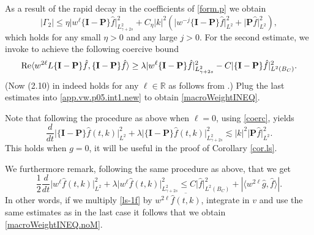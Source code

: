 \documentclass{amsart}
\numberwithin{equation}{section}
\begin{document}
As a result of the rapid decay in the coefficients of \eqref{form.p} we obtain
$$
\left| {\Gamma}_2 \right| \le
\eta {|} w^{\ell}\{{\mathbf{I}}-{\mathbf{P}}\}\hat{f}{|}^2_{L^2_{\gamma+2s}}
+
C_\eta |k|^2 \left( {|} w^{-{j}}\{{\mathbf{I}}-{\mathbf{P}}\}\hat{f}{|}^2_{L^2}+{|} {\mathbf{P}} \hat{f}{|}^2_{L^2} \right), 
$$
which holds for any small $\eta >0$ and any large ${j}>0$. For the second estimate, we invoke \cite[Lemma 2.6]{gsNonCut0} to achieve the following coercive bound
$$
{{\rm Re}}  \langle w^{2{\ell}}{L}\{{\mathbf{I}}-{\mathbf{P}}\} \hat{f},\{{\mathbf{I}}-{\mathbf{P}}\} \hat{f}\rangle
 \ge {\lambda} {|} w^{\ell}\{{\mathbf{I}}-{\mathbf{P}}\}\hat{f}{|}^2_{L^2_{\gamma+2s}}
 -
 C  {|}\{{\mathbf{I}}-{\mathbf{P}}\}\hat{f}{|}_{L^2(B_{C})}^2.
$$
(Now (2.10) in \cite[Lemma 2.6]{gsNonCut0} indeed holds for any $\ell \in {\mathbb{R}}$ as follows from \cite[Lemma 2.4 and Lemma 2.5]{gsNonCut0}.)  Plug the last estimates into \eqref{app.vw.p05.int1.new} to obtain \eqref{macroWeightINEQ}.

Note that following the procedure as above when ${\ell} =0$, using \eqref{coerc}, yields
\begin{equation}\label{macroWeightINEQ.noL}
\frac{d}{dt}{|} \{{\mathbf{I}}-{\mathbf{P}}\}\hat{f}(t,k){|}^2_{L^2} +
{\lambda} {|} \{{\mathbf{I}}-{\mathbf{P}}\}\hat{f}(t,k){|}^2_{L^2_{\gamma+2s}}
\lesssim
 |k|^2 {|} {\mathbf{P}} \hat{f}{|}^2_{L^2}.
\end{equation}
This holds when ${g}=0$, it will be useful in the proof of Corollary \ref{cor.ls}.

We furthermore remark, following the same procedure as above, that we get
\begin{equation}\label{macroWeightINEQ.noM}
\frac{1}{2}\frac{d}{dt}{|} w^{\ell}\hat{f}(t,k){|}^2_{L^2} +
{\lambda} {|} w^{\ell}\hat{f}(t,k){|}^2_{L^2_{\gamma+2s}}
\le 
 C  {|}\hat{f}{|}_{L^2(B_{C})}^2
+
\left| \langle w^{2{\ell}} \hat{g}, \hat{f}\rangle \right|.
\end{equation}
In other words, if we multiply \eqref{ls-1f} by $w^{2{\ell}}\overline{\hat{f}(t,k)}$, integrate in ${v}$ and use the same estimates as in the last case it follows that we obtain \eqref{macroWeightINEQ.noM}. 
\end{document}
